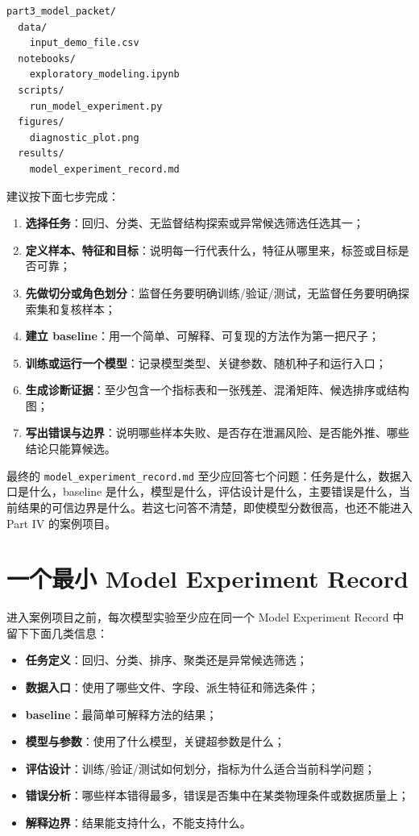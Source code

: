 \begin{examplebox}
\begin{lstlisting}[style=terminal]
part3_model_packet/
  data/
    input_demo_file.csv
  notebooks/
    exploratory_modeling.ipynb
  scripts/
    run_model_experiment.py
  figures/
    diagnostic_plot.png
  results/
    model_experiment_record.md
\end{lstlisting}
\end{examplebox}

建议按下面七步完成：

\begin{enumerate}
    \item \textbf{选择任务}：回归、分类、无监督结构探索或异常候选筛选任选其一；
    \item \textbf{定义样本、特征和目标}：说明每一行代表什么，特征从哪里来，标签或目标是否可靠；
    \item \textbf{先做切分或角色划分}：监督任务要明确训练/验证/测试，无监督任务要明确探索集和复核样本；
    \item \textbf{建立 baseline}：用一个简单、可解释、可复现的方法作为第一把尺子；
    \item \textbf{训练或运行一个模型}：记录模型类型、关键参数、随机种子和运行入口；
    \item \textbf{生成诊断证据}：至少包含一个指标表和一张残差、混淆矩阵、候选排序或结构图；
    \item \textbf{写出错误与边界}：说明哪些样本失败、是否存在泄漏风险、是否能外推、哪些结论只能算候选。
\end{enumerate}

最终的 \texttt{model\_experiment\_record.md} 至少应回答七个问题：任务是什么，数据入口是什么，baseline 是什么，模型是什么，评估设计是什么，主要错误是什么，当前结果的可信边界是什么。若这七问答不清楚，即使模型分数很高，也还不能进入 Part IV 的案例项目。

\section*{一个最小 Model Experiment Record}

进入案例项目之前，每次模型实验至少应在同一个 Model Experiment Record 中留下下面几类信息：

\begin{itemize}
    \item \textbf{任务定义}：回归、分类、排序、聚类还是异常候选筛选；
    \item \textbf{数据入口}：使用了哪些文件、字段、派生特征和筛选条件；
    \item \textbf{baseline}：最简单可解释方法的结果；
    \item \textbf{模型与参数}：使用了什么模型，关键超参数是什么；
    \item \textbf{评估设计}：训练/验证/测试如何划分，指标为什么适合当前科学问题；
    \item \textbf{错误分析}：哪些样本错得最多，错误是否集中在某类物理条件或数据质量上；
    \item \textbf{解释边界}：结果能支持什么，不能支持什么。
\end{itemize}

